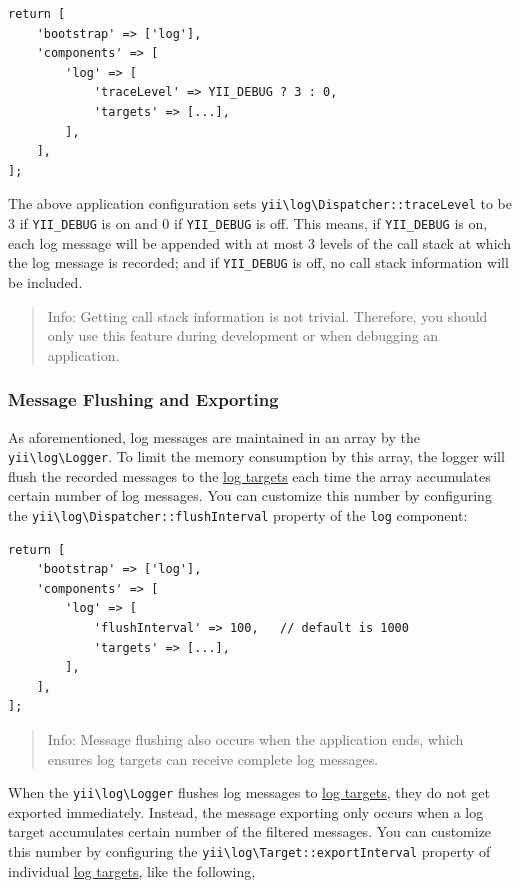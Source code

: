\lstset{language=php}\begin{lstlisting}
return [
    'bootstrap' => ['log'],
    'components' => [
        'log' => [
            'traceLevel' => YII_DEBUG ? 3 : 0,
            'targets' => [...],
        ],
    ],
];
\end{lstlisting}
The above application configuration sets \texttt{yii{\allowbreak{}\textbackslash}log{\allowbreak{}\textbackslash}Dispatcher\allowbreak{}::\allowbreak{}traceLevel} to be 3 if \lstinline|YII_DEBUG| is on
and 0 if \lstinline|YII_DEBUG| is off. This means, if \lstinline|YII_DEBUG| is on, each log message will be appended with at most 3
levels of the call stack at which the log message is recorded; and if \lstinline|YII_DEBUG| is off, no call stack information
will be included.

\begin{quote}Info: Getting call stack information is not trivial. Therefore, you should only use this feature during development
or when debugging an application.

\end{quote}
\subsubsection{Message Flushing and Exporting \label{runtime-logging.md::flushing-exporting}}
As aforementioned, log messages are maintained in an array by the \texttt{yii{\allowbreak{}\textbackslash}log{\allowbreak{}\textbackslash}Logger}. To limit the
memory consumption by this array, the logger will flush the recorded messages to the \hyperref[runtime-logging.md::::log-targets]{log targets}
each time the array accumulates certain number of log messages. You can customize this number by configuring
the \texttt{yii{\allowbreak{}\textbackslash}log{\allowbreak{}\textbackslash}Dispatcher\allowbreak{}::\allowbreak{}flushInterval} property of the \lstinline|log| component:

\lstset{language=php}\begin{lstlisting}
return [
    'bootstrap' => ['log'],
    'components' => [
        'log' => [
            'flushInterval' => 100,   // default is 1000
            'targets' => [...],
        ],
    ],
];
\end{lstlisting}
\begin{quote}Info: Message flushing also occurs when the application ends, which ensures log targets can receive complete log messages.

\end{quote}
When the \texttt{yii{\allowbreak{}\textbackslash}log{\allowbreak{}\textbackslash}Logger} flushes log messages to \hyperref[runtime-logging.md::::log-targets]{log targets}, they do not get exported
immediately. Instead, the message exporting only occurs when a log target accumulates certain number of the filtered
messages. You can customize this number by configuring the \texttt{yii{\allowbreak{}\textbackslash}log{\allowbreak{}\textbackslash}Target\allowbreak{}::\allowbreak{}exportInterval}
property of individual \hyperref[runtime-logging.md::::log-targets]{log targets}, like the following,


